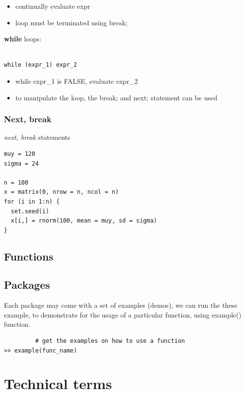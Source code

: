 \begin{itemize}
\item continually evaluate expr
\item loop must be terminated using break;
\end{itemize}

{\bf while} loops:
\begin{verbatim}

while (expr_1) expr_2
\end{verbatim}

\begin{itemize}
\item while expr\_1 is FALSE, evaluate expr\_2
\item to manipulate the loop, the break; and next; statement can be
  used
\end{itemize}

\subsubsection{Next, break}
\label{sec:next-break}

 {\it next, break} statements

\begin{lstlisting}
muy = 120
sigma = 24

n = 100
x = matrix(0, nrow = n, ncol = n)
for (i in 1:n) {
  set.seed(i)
  x[i,] = rnorm(100, mean = muy, sd = sigma)
}
\end{lstlisting}

\subsection{Functions}
\label{sec:functions}

\subsection{Packages}
\label{sec:packages}

Each package may come with a set of examples (demos), we can run the
these example, to demonstrate for the usage of a particular function,
using example() function.
\begin{lstlisting}
         # get the examples on how to use a function
>> example(func_name)	
\end{lstlisting}

\section{Technical terms}
\label{sec:technical-terms}


